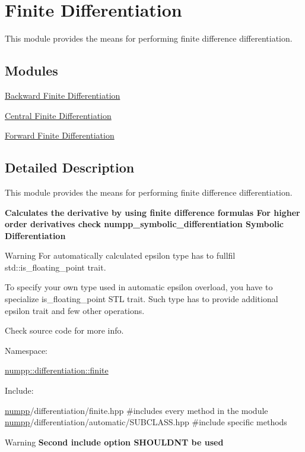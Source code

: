 \hypertarget{group__numpp__differentiation__finite}{}\section{Finite Differentiation}
\label{group__numpp__differentiation__finite}


This module provides the means for performing finite difference differentiation.  


\subsection*{Modules}
\begin{DoxyCompactItemize}
\item 
\hyperlink{group__numpp__differentiation__finite__backward}{Backward Finite Differentiation}
\item 
\hyperlink{group__numpp__differentiation__finite__central}{Central Finite Differentiation}
\item 
\hyperlink{group__numpp__differentiation__finite__forward}{Forward Finite Differentiation}
\end{DoxyCompactItemize}


\subsection{Detailed Description}
This module provides the means for performing finite difference differentiation. 

{\bfseries Calculates the derivative by using finite difference formulas For higher order derivatives check numpp\+\_\+symbolic\+\_\+differentiation Symbolic Differentiation }

\begin{DoxyWarning}{Warning}
For automatically calculated epsilon type has to fullfil std\+::is\+\_\+floating\+\_\+point trait.

To specify your own type used in automatic epsilon overload, you have to specialize is\+\_\+floating\+\_\+point S\+TL trait. Such type has to provide additional epsilon trait and few other operations.

Check source code for more info.
\end{DoxyWarning}
Namespace\+: 
\begin{DoxyCode}
\hyperlink{namespacenumpp_1_1differentiation_1_1finite}{numpp::differentiation::finite}
\end{DoxyCode}


Include\+: 
\begin{DoxyCode}
\hyperlink{namespacenumpp}{numpp}/differentiation/finite.hpp #includes every method in the module
\hyperlink{namespacenumpp}{numpp}/differentiation/automatic/SUBCLASS.hpp #include specific methods
\end{DoxyCode}


\begin{DoxyWarning}{Warning}
{\bfseries Second include option S\+H\+O\+U\+L\+DN\textquotesingle{}T be used} 
\end{DoxyWarning}
